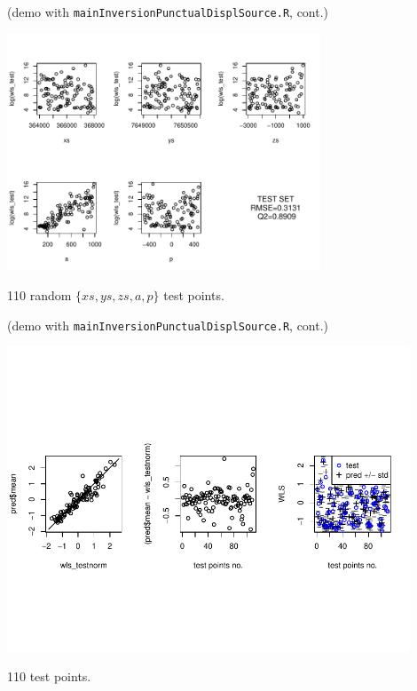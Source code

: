 \documentclass{beamer}
\begin{document}
\begin{frame}{}
\small (demo with \texttt{mainInversionPunctualDisplSource.R}, cont.)
\begin{center}
\includegraphics[width=0.7\textwidth]{figures/misfit_test_set} 
\end{center}
{\tiny 110 random $\{xs,ys,zs,a,p\}$ test points.}\\
\end{frame}

\begin{frame}{}
\small (demo with \texttt{mainInversionPunctualDisplSource.R}, cont.)
\begin{center}
\includegraphics[width=0.9\textwidth]{figures/misfit_test_set_2} 
\end{center}
{\tiny 110 test points.}\\
\end{frame}
\end{document}
